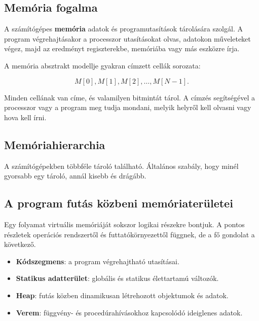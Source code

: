 \subsection{Memória fogalma}

A számítógépes \textbf{memória} adatok és programutasítások tárolására szolgál. A program végrehajtásakor a processzor utasításokat olvas, adatokon műveleteket végez, majd az eredményt regiszterekbe, memóriába vagy más eszközre írja.

A memória absztrakt modellje gyakran címzett cellák sorozata:

\[
M[0], M[1], M[2],\ldots,M[N-1].
\]

Minden cellának van címe, és valamilyen bitmintát tárol. A címzés segítségével a processzor vagy a program meg tudja mondani, melyik helyről kell olvasni vagy hova kell írni.

\subsection{Memóriahierarchia}

A számítógépekben többféle tároló található. Általános szabály, hogy minél gyorsabb egy tároló, annál kisebb és drágább.

\begin{center}

\end{center}

\subsection{A program futás közbeni memóriaterületei}

Egy folyamat virtuális memóriáját sokszor logikai részekre bontjuk. A pontos részletek operációs rendszertől és futtatókörnyezettől függnek, de a fő gondolat a következő.



\begin{itemize}
  \item \textbf{Kódszegmens}: a program végrehajtható utasításai.
  \item \textbf{Statikus adatterület}: globális és statikus élettartamú változók.
  \item \textbf{Heap}: futás közben dinamikusan létrehozott objektumok és adatok.
  \item \textbf{Verem}: függvény- és procedúrahívásokhoz kapcsolódó ideiglenes adatok.
\end{itemize}

